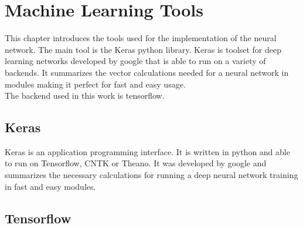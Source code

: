 \chapter{Machine Learning Tools}

This chapter introduces the tools used for the implementation of the neural network. The main tool is the Keras python library. Keras is toolset for deep learning networks developed by google that is able to run on a variety of backends. It summarizes the vector calculations needed for a neural network in modules making it perfect for fast and easy usage.\\
The backend used in this work is tensorflow.

\section{Keras}

Keras is an application programming interface. It is written in python and able to run on Tensorflow, CNTK or Theano. It was developed by google and summarizes the necessary calculations for running a deep neural network training in fast and easy modules.

\cite{chollet2015keras}

\section{Tensorflow}